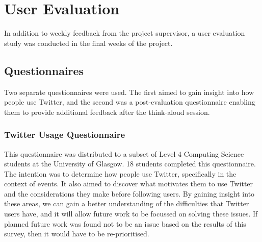 \documentclass{l4proj}
\begin{document}
\section{User Evaluation}

    In addition to weekly feedback from the project supervisor, a user evaluation study was conducted in the final weeks of the project.

    \subsection{Questionnaires}
    Two separate questionnaires were used. The first aimed to gain insight into how people use Twitter, and the second was a post-evaluation questionnaire enabling them to provide additional feedback after the think-aloud session.
    
        \subsubsection{Twitter Usage Questionnaire}
        This questionnaire was distributed to a subset of Level 4 Computing Science students at the University of Glasgow. 18 students completed this questionnaire. The intention was to determine how people use Twitter, specifically in the context of events. It also aimed to discover what motivates them to use Twitter and the considerations they make before following users. By gaining insight into these areas, we can gain a better understanding of the difficulties that Twitter users have, and it will allow future work to be focussed on solving these issues. If planned future work was found not to be an issue based on the results of this survey, then it would have to be re-prioritised.
\end{document}
